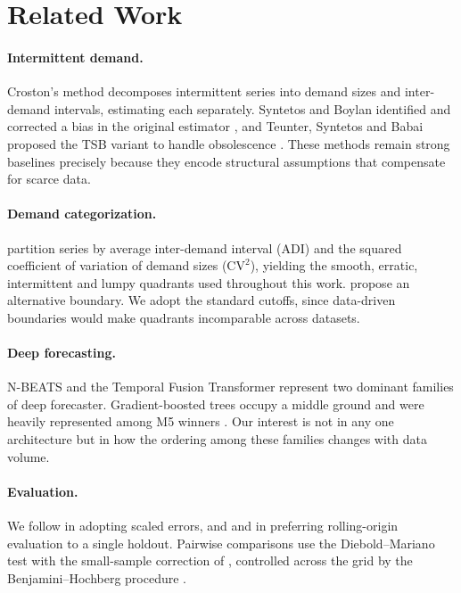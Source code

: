 \documentclass[11pt]{article}
\begin{document}
\section{Related Work}

\paragraph{Intermittent demand.} Croston's method \citep{croston1972} decomposes
intermittent series into demand sizes and inter-demand intervals, estimating each
separately. Syntetos and Boylan identified and corrected a bias in the original
estimator \citep{syntetos2005accuracy}, and Teunter, Syntetos and Babai proposed
the TSB variant to handle obsolescence \citep{teunter2011}. These methods remain
strong baselines precisely because they encode structural assumptions that
compensate for scarce data.

\paragraph{Demand categorization.} \citet{syntetos2005categorization} partition
series by average inter-demand interval (ADI) and the squared coefficient of
variation of demand sizes ($\mathrm{CV}^2$), yielding the smooth, erratic,
intermittent and lumpy quadrants used throughout this work. \citet{kostenko2006note}
propose an alternative boundary. We adopt the standard cutoffs, since
data-driven boundaries would make quadrants incomparable across datasets.

\paragraph{Deep forecasting.} N-BEATS \citep{oreshkin2020nbeats} and the
Temporal Fusion Transformer \citep{lim2021tft} represent two dominant families of
deep forecaster. Gradient-boosted trees \citep{ke2017lightgbm} occupy a middle
ground and were heavily represented among M5 winners
\citep{makridakis2022m5}. Our interest is not in any one architecture but in how
the ordering among these families changes with data volume.

\paragraph{Evaluation.} We follow \citet{hyndman2006another} in adopting scaled
errors, and \citet{tashman2000} and \citet{bergmeir2012} in preferring
rolling-origin evaluation to a single holdout. Pairwise comparisons use the
Diebold--Mariano test \citep{diebold1995comparing} with the small-sample
correction of \citet{harvey1997testing}, controlled across the grid by the
Benjamini--Hochberg procedure \citep{benjamini1995controlling}.
\end{document}
